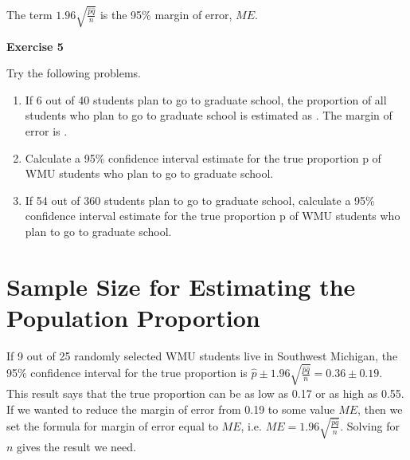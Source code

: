 \documentclass[11pt, chapterprefix=true]{scrbook}\usepackage[]{graphicx}\usepackage[]{color}
\begin{document}

The term $1.96 \sqrt{\frac{\hat{p} \hat{q}}{n}}$ is the 95\% margin of error, $ME$.

\begin{minipage}[ht]{3cm}

\vspace{-50mm}

\textbf{Exercise 5}
\end{minipage}
\begin{minipage}[ht]{11cm}

\parbox{11cm}{
Try the following problems.

\begin{enumerate}
\item If 6 out of 40 students plan to go to graduate school, the proportion of all students who plan to go to graduate school is estimated as \underline{\phantom{xxxxxxxxxx}}.  The margin of error is \underline{\phantom{xxxxxxxxxx}}.
\item Calculate a 95\% confidence interval estimate for the true proportion p of WMU students who plan to go to graduate school.
\item If 54 out of 360 students plan to go to graduate school, calculate a 95\% confidence interval estimate for the true proportion p of WMU students who plan to go to graduate school.
\end{enumerate}
}
\end{minipage}

\section{Sample Size for Estimating the Population Proportion}
 
If 9 out of 25 randomly selected WMU students live in Southwest Michigan, the 95\% confidence interval for the true proportion is $\hat{p} \pm 1.96 \sqrt{\frac{\hat{p} \hat{q}}{n}} = 0.36 \pm 0.19$.  This result says that the true proportion can be as low as 0.17 or as high as 0.55.  If we wanted to reduce the margin of error from 0.19 to some value $ME$, then we set the formula for margin of error equal to $ME$, i.e. $ME = 1.96 \sqrt{\frac{\hat{p} \hat{q}}{n}}$.  Solving for $n$ gives the result we need.
\end{document}
